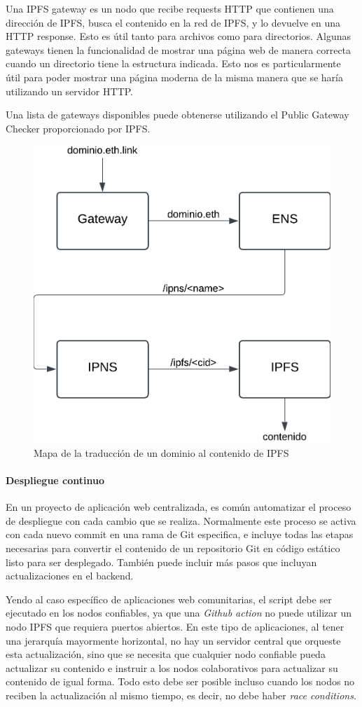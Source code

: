Una IPFS gateway es un nodo que recibe requests HTTP que contienen una dirección de IPFS, busca el contenido en la red de IPFS, y lo devuelve en una HTTP response. Esto es útil tanto para archivos como para directorios. Algunas gateways tienen la funcionalidad de mostrar una página web de manera correcta cuando un directorio tiene la estructura indicada. Esto nos es particularmente útil para poder mostrar una página moderna de la misma manera que se haría utilizando un servidor HTTP.

Una lista de gateways disponibles puede obtenerse utilizando el Public Gateway Checker \cite{public-gateway-checker} proporcionado por IPFS.

\begin{figure}[h!]
    \centering
    \includegraphics[width=0.5\linewidth]{img/solucion-ipfs/traduccion-dominio.png}
    \caption{Mapa de la traducción de un dominio al contenido de IPFS}
    \label{fig:traduccion-ipfs}
\end{figure}

\paragraph{Despliegue continuo}

En un proyecto de aplicación web centralizada, es común automatizar el proceso de despliegue con cada cambio que se realiza. Normalmente este proceso se activa con cada nuevo commit en una rama de Git especifica, e incluye todas las etapas necesarias para convertir el contenido de un repositorio Git en código estático listo para ser desplegado. También puede incluir más pasos que incluyan actualizaciones en el backend.

Yendo al caso específico de aplicaciones web comunitarias, el script debe ser ejecutado en los nodos confiables, ya que una \textit{Github action} no puede utilizar un nodo IPFS que requiera puertos abiertos. En este tipo de aplicaciones, al tener una jerarquía mayormente horizontal, no hay un servidor central que orqueste esta actualización, sino que se necesita que cualquier nodo confiable pueda actualizar su contenido e instruir a los nodos colaborativos para actualizar su contenido de igual forma. Todo esto debe ser posible incluso cuando los nodos no reciben la actualización al mismo tiempo, es decir, no debe haber \textit{race conditions}.

